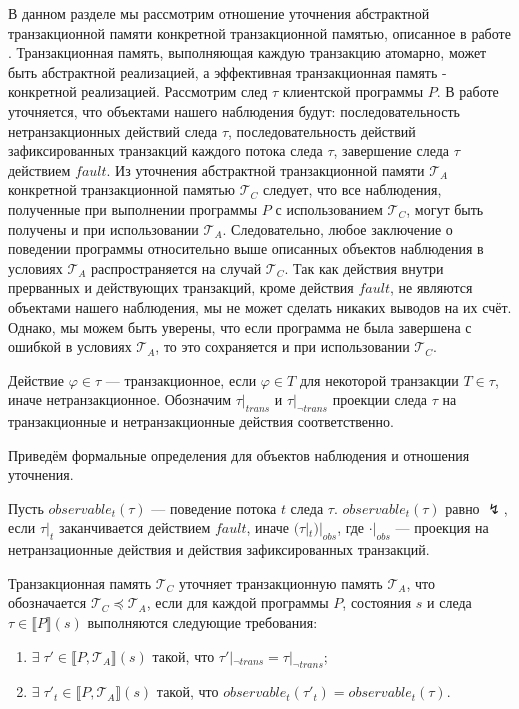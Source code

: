 В данном разделе мы рассмотрим отношение уточнения абстрактной транзакционной памяти конкретной транзакционной памятью, описанное в работе \cite{tms_article}. Транзакционная память, выполняющая каждую транзакцию атомарно, может быть абстрактной реализацией, а эффективная транзакционная память - конкретной реализацией. Рассмотрим след $\tau$ клиентской программы $P$. В работе \cite{tms_article} уточняется, что объектами нашего наблюдения будут: последовательность нетранзакционных действий следа $\tau$, последовательность действий зафиксированных транзакций каждого потока следа $\tau$, завершение следа $\tau$ действием $fault$. Из уточнения абстрактной транзакционной памяти $\mathcal{T}_A$ конкретной транзакционной памятью $\mathcal{T}_C$ следует, что все наблюдения, полученные при выполнении программы $P$ с использованием $\mathcal{T}_C$, могут быть получены и при использовании $\mathcal{T}_A$. Следовательно, любое заключение о поведении программы относительно выше описанных объектов наблюдения в условиях $\mathcal{T}_A$ распространяется на случай $\mathcal{T}_C$. Так как действия внутри прерванных и действующих транзакций, кроме действия $fault$, не являются объектами нашего наблюдения, мы не может сделать никаких выводов на их счёт. Однако, мы можем быть уверены, что если программа не была завершена с ошибкой в условиях $\mathcal{T}_A$, то это сохраняется и при использовании $\mathcal{T}_C$.

Действие $\varphi \in \tau$ --- транзакционное, если $\varphi \in T$ для некоторой транзакции $T \in \tau$, иначе нетранзакционное. Обозначим $\tau|_{trans}$ и $\tau|_{\neg trans}$ проекции следа $\tau$ на транзакционные и нетранзакционные действия соответственно.

Приведём формальные определения для объектов наблюдения и отношения уточнения. 

\begin{mydefinition}
Пусть $observable_t(\tau)$ --- поведение потока $t$ следа $\tau$. $observable_t(\tau)$ равно $\lightning$, если $\tau|_t$ заканчивается действием $fault$, иначе $(\tau|_t)|_{obs}$, где $\cdot|_{obs}$ --- проекция на нетранзационные действия и действия зафиксированных транзакций.
\end{mydefinition}

\begin{mydefinition}\label{obs_ref}
Транзакционная память $\mathcal{T}_C$ уточняет транзакционную память $\mathcal{T}_A$, что обозначается $\mathcal{T}_C \preceq \mathcal{T}_A$, если для каждой программы $P$, состояния $s$ и следа $\tau \in \llbracket P \rrbracket(s)$ выполняются следующие требования: \begin{enumerate}[label=(\roman*)]
\item $\exists \; \tau' \in \llbracket P, \mathcal{T}_A \rrbracket(s)$ такой, что $\tau'|_{\neg trans} = \tau|_{\neg trans}$;
\item $\exists \; \tau'_t \in \llbracket P, \mathcal{T}_A \rrbracket(s)$ такой, что $observable_t(\tau'_t) = observable_t(\tau)$.
\end{enumerate} 
\end{mydefinition}

